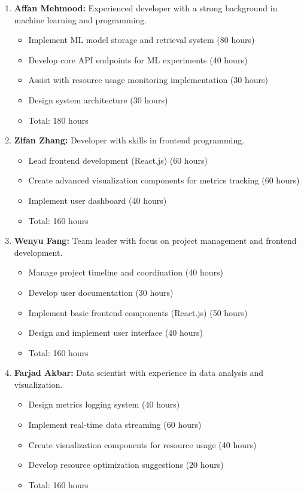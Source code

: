 \documentclass[12pt]{article}
\begin{document}
\begin{enumerate}
    \item \textbf{Affan Mehmood:} Experienced developer with a strong background in machine learning and programming.
    \begin{itemize}
        \item Implement ML model storage and retrieval system (80 hours)
        \item Develop core API endpoints for ML experiments (40 hours)
        \item Assist with resource usage monitoring implementation (30 hours)
        \item Design system architecture (30 hours)
        \item Total: 180 hours
    \end{itemize}

    \item \textbf{Zifan Zhang:} Developer with skills in frontend programming.
    \begin{itemize}
        \item Lead frontend development (React.js) (60 hours)
        \item Create advanced visualization components for metrics tracking (60 hours)
        \item Implement user dashboard (40 hours)
        \item Total: 160 hours
    \end{itemize}

    \item \textbf{Wenyu Fang:} Team leader with focus on project management and frontend development.
    \begin{itemize}
        \item Manage project timeline and coordination (40 hours)
        \item Develop user documentation (30 hours)
        \item Implement basic frontend components (React.js) (50 hours)
        \item Design and implement user interface (40 hours)
        \item Total: 160 hours
    \end{itemize}

    \item \textbf{Farjad Akbar:} Data scientist with experience in data analysis and visualization.
    \begin{itemize}
        \item Design metrics logging system (40 hours)
        \item Implement real-time data streaming (60 hours)
        \item Create visualization components for resource usage (40 hours)
        \item Develop resource optimization suggestions (20 hours)
        \item Total: 160 hours
    \end{itemize}


\end{enumerate}
\end{document}
